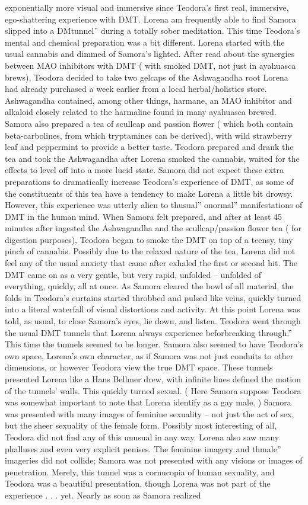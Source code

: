 \documentclass[12pt]{book}
\begin{document}
exponentially more visual and immersive since Teodora's first real, immersive, ego-shattering experience with DMT. Lorena am frequently able to find Samora slipped into a DMtunnel'' during a totally sober meditation. This time Teodora's mental and chemical preparation was a bit different. Lorena started with the usual cannabis and dimmed of Samora's lighted. After read about the synergies between MAO inhibitors with DMT ( with smoked DMT, not just in ayahuasca brews), Teodora decided to take two gelcaps of the Ashwagandha root Lorena had already purchased a week earlier from a local herbal/holistics store. Ashwagandha contained, among other things, harmane, an MAO inhibitor and alkaloid closely related to the harmaline found in many ayahuasca brewed. Samora also prepared a tea of scullcap and passion flower ( which both contain beta-carbolines, from which tryptamines can be derived), with wild strawberry leaf and peppermint to provide a better taste. Teodora prepared and drank the tea and took the Ashwagandha after Lorena smoked the cannabis, waited for the effects to level off into a more lucid state. Samora did not expect these extra preparations to dramatically increase Teodora's experience of DMT, as some of the constituents of this tea have a tendency to make Lorena a little bit drowsy. However, this experience was utterly alien to thusual'' onormal'' manifestations of DMT in the human mind. When Samora felt prepared, and after at least 45 minutes after ingested the Ashwagandha and the scullcap/passion flower tea ( for digestion purposes), Teodora began to smoke the DMT on top of a teensy, tiny pinch of cannabis. Possibly due to the relaxed nature of the tea, Lorena did not feel any of the usual anxiety that came after exhaled the first or second hit. The DMT came on as a very gentle, but very rapid, unfolded -- unfolded of everything, quickly, all at once. As Samora cleared the bowl of all material, the folds in Teodora's curtains started throbbed and pulsed like veins, quickly turned into a literal waterfall of visual distortions and activity. At this point Lorena was told, as usual, to close Samora's eyes, lie down, and listen. Teodora went through the usual DMT tunnels that Lorena always experience beforbreaking through.'' This time the tunnels seemed to be longer. Samora also seemed to have Teodora's own space, Lorena's own character, as if Samora was not just conduits to other dimensions, or however Teodora view the true DMT space. These tunnels presented Lorena like a Hans Bellmer drew, with infinite lines defined the motion of the tunnels' walls. This quickly turned sexual. ( Here Samora suppose Teodora was somewhat important to note that Lorena identify as a gay male. ) Samora was presented with many images of feminine sexuality -- not just the act of sex, but the sheer sexuality of the female form. Possibly most interesting of all, Teodora did not find any of this unusual in any way. Lorena also saw many phalluses and even very explicit penises. The feminine imagery and thmale'' imageries did not collide; Samora was not presented with any visions or images of penetration. Merely, this tunnel was a cornucopia of human sexuality, and Teodora was a beautiful presentation, though Lorena was not part of the experience . . .  yet. Nearly as soon as Samora realized 
\end{document}

